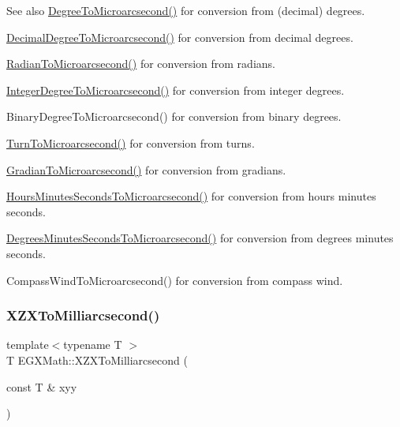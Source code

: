 \begin{DoxySeeAlso}{See also}
\mbox{\hyperlink{group___e_g_x_math-_angle_conversions-_degree_ga31b65388fe1b4656663b3d66b9d764e6}{Degree\+To\+Microarcsecond()}} for conversion from (decimal) degrees. 

\mbox{\hyperlink{group___e_g_x_math-_angle_conversions-_decimal_degree_ga6fa88456069907fd24716fa575517571}{Decimal\+Degree\+To\+Microarcsecond()}} for conversion from decimal degrees. 

\mbox{\hyperlink{group___e_g_x_math-_angle_conversions-_radian_ga3a515ca2838a305fa40750763f546a86}{Radian\+To\+Microarcsecond()}} for conversion from radians. 

\mbox{\hyperlink{group___e_g_x_math-_angle_conversions-_integer_degree_ga69179d6082764595c7014805e1f6b31e}{Integer\+Degree\+To\+Microarcsecond()}} for conversion from integer degrees. 

Binary\+Degree\+To\+Microarcsecond() for conversion from binary degrees. 

\mbox{\hyperlink{group___e_g_x_math-_angle_conversions-_turn_ga41a861a04d65aab05647b32142e6d80d}{Turn\+To\+Microarcsecond()}} for conversion from turns. 

\mbox{\hyperlink{group___e_g_x_math-_angle_conversions-_gradian_gab7781c860ea3ab9c9cf76ab639846a07}{Gradian\+To\+Microarcsecond()}} for conversion from gradians. 

\mbox{\hyperlink{group___e_g_x_math-_angle_conversions-_hours_minutes_seconds_ga061e4fa10d73e459d5f411cfe436bbe3}{Hours\+Minutes\+Seconds\+To\+Microarcsecond()}} for conversion from hours minutes seconds. 

\mbox{\hyperlink{group___e_g_x_math-_angle_conversions-_degrees_minutes_seconds_gabc4de7934e776de13953707344a4da88}{Degrees\+Minutes\+Seconds\+To\+Microarcsecond()}} for conversion from degrees minutes seconds. 

Compass\+Wind\+To\+Microarcsecond() for conversion from compass wind. 
\end{DoxySeeAlso}
\mbox{\label{group___e_g_x_math-_angle_conversions-_x_z_x_ga164fd354ff7a249d92865b51beca40d2}} 
\subsubsection{\texorpdfstring{X\+Z\+X\+To\+Milliarcsecond()}{XZXToMilliarcsecond()}}
{\footnotesize\ttfamily template$<$typename T $>$ \\
T E\+G\+X\+Math\+::\+X\+Z\+X\+To\+Milliarcsecond (\begin{DoxyParamCaption}\item[{const T \&}]{xyy }\end{DoxyParamCaption})}



